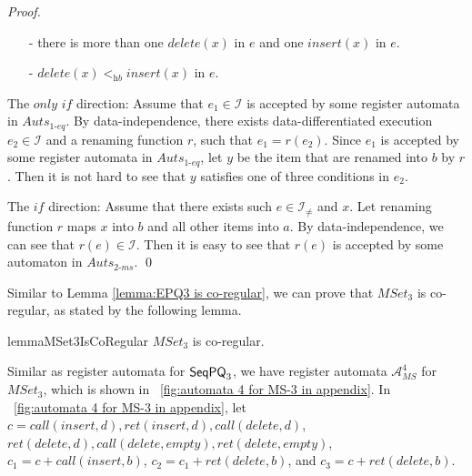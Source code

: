 {\begin {proof}
\begin{itemize}
\item[-] there is more than one $\textit{delete}(x)$ in $e$ and one $\textit{insert}(x)$ in $e$.

\item[-] $\textit{delete}(x) <_{\textit{hb}} \textit{insert}(x)$ in $e$.
\end{itemize}

\noindent The $\textit{only if}$ direction: Assume that $e_1 \in \mathcal{I}$ is accepted by some register automata in $\textit{Auts}_{\textit{1-eq}}$. By data-independence, there exists data-differentiated execution $e_2 \in \mathcal{I}$ and a renaming function $r$, such that $e_1=r(e_2)$. Since $e_1$ is accepted by some register automata in  $\textit{Auts}_{\textit{1-eq}}$, let $y$ be the item that are renamed into $b$ by $r$. Then it is not hard to see that $y$ satisfies one of three conditions in $e_2$.

\noindent The $\textit{if}$ direction: Assume that there exists such $e \in \mathcal{I}_{\neq}$ and $x$. Let renaming function $r$ maps $x$ into $b$ and all other items into $a$. By data-independence, we can see that $r(e) \in \mathcal{I}$. Then it is easy to see that $r(e)$ is accepted by some automaton in $\textit{Auts}_{\textit{2-ms}}$. \qed
\end {proof}

Similar to Lemma \ref{lemma:EPQ3 is co-regular}, we can prove that $\textit{MSet}_3$ is co-regular, as stated by the following lemma.

\begin{restatable}{lemma}{MSet3IsCoRegular}
\label{lemma:MSet3 is co-regular}
$\textit{MSet}_3$ is co-regular.
\end{restatable}

Similar as register automata for $\mathsf{SeqPQ}_3$, we have register automata $\mathcal{A}_{\textit{MS}}^4$ for $\textit{MSet}_3$, which is shown in \figurename~\ref{fig:automata 4 for MS-3 in appendix}. In \figurename~\ref{fig:automata 4 for MS-3 in appendix}, let $c = \textit{call}(\textit{insert},d),\textit{ret}(\textit{insert},d), \textit{call}(\textit{delete},d)$, $\textit{ret}(\textit{delete},d),\textit{call}(\textit{delete},\textit{empty}),\textit{ret}(\textit{delete},\textit{empty})$, $c_1 = c + \textit{call}(\textit{insert},b)$, $c_2 = c_1 + \textit{ret}(\textit{delete},b)$, and $c_3 = c + \textit{ret}(\textit{delete},b)$.

}
